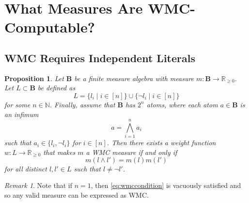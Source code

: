 \documentclass{article}
\newtheorem{proposition}{Proposition}
\theoremstyle{definition}
\theoremstyle{remark}
\newtheorem*{remark}{Remark}
\begin{document}
\section{What Measures Are WMC-Computable?}

\subsection{WMC Requires Independent Literals}


\begin{proposition}
  Let $\mathbf{B}$ be a finite measure algebra with measure $m\colon \mathbf{B} \to
  \mathbb{R}_{\ge 0}$. Let $L \subset \mathbf{B}$ be defined as
  \[
  L = \{ l_i \mid i \in [n] \} \cup \{ \neg l_i \mid i \in [n] \}
  \]
  for some $n \in \mathbb{N}$. Finally, assume that $\mathbf{B}$ has $2^n$
  atoms, where each atom $a \in \mathbf{B}$ is an infimum
  \[
    a = \bigwedge_{i=1}^n a_i
  \]
  such that $a_i \in \{ l_i, \neg l_i \}$ for $i \in [n]$. Then there exists a
  weight function $w\colon L \to \mathbb{R}_{\ge 0}$ that makes $m$ a WMC measure if
  and only if
  \begin{equation} \label{eq:wmccondition}
  m(l \land l') = m(l)m(l')
  \end{equation}
  for all distinct $l, l' \in L$ such that $l \ne \neg l'$.
\end{proposition}

\begin{remark}
  Note that if $n = 1$, then \cref{eq:wmccondition} is vacuously satisfied and
  so any valid measure can be expressed as WMC.
\end{remark}
\end{document}
